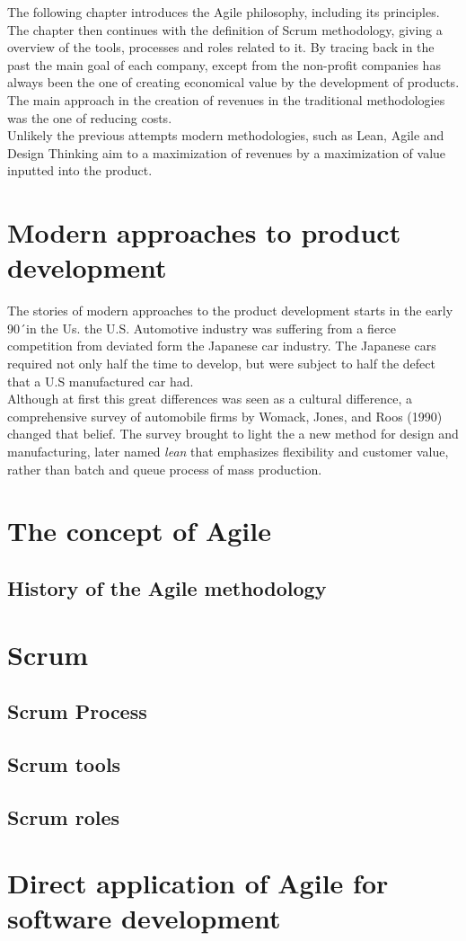 \documentclass[../main.tex]{subfiles}
\begin{document}
The following chapter introduces the Agile philosophy, including its principles. The chapter then continues with the definition of Scrum methodology, giving a overview of the tools, processes and roles related to it. 
By tracing back in the past the main goal of each company, except from the non-profit companies has always been the one of creating economical value by the development of products. The main approach in the creation of revenues in the traditional methodologies was the one of reducing costs.\\
Unlikely the previous attempts modern methodologies, such as Lean, Agile and Design Thinking aim to a maximization of revenues by a maximization of value inputted into the product.\\
\section{Modern approaches to product development}
The stories of modern approaches to the product development starts in the early 90´in the Us. the U.S. Automotive industry was suffering from a fierce competition from deviated form the Japanese car industry. The Japanese cars required not only half the time to develop, but were subject to half the defect that a U.S manufactured car had.\\
Although at first this great differences was seen as a cultural difference, a comprehensive survey of automobile firms by Womack, Jones, and Roos (1990) changed that belief. The survey brought to light the a new method for design and manufacturing, later named \textit{lean} that emphasizes flexibility and customer value, rather than batch and queue process of mass production. 
\section{The concept of Agile}
\subsection{History of the Agile methodology}
\section{Scrum}
\subsection{Scrum Process}
\subsection{Scrum tools}
\subsection{Scrum roles}
\section{Direct application of Agile for software development}
\cleardoublepage
\end{document}

